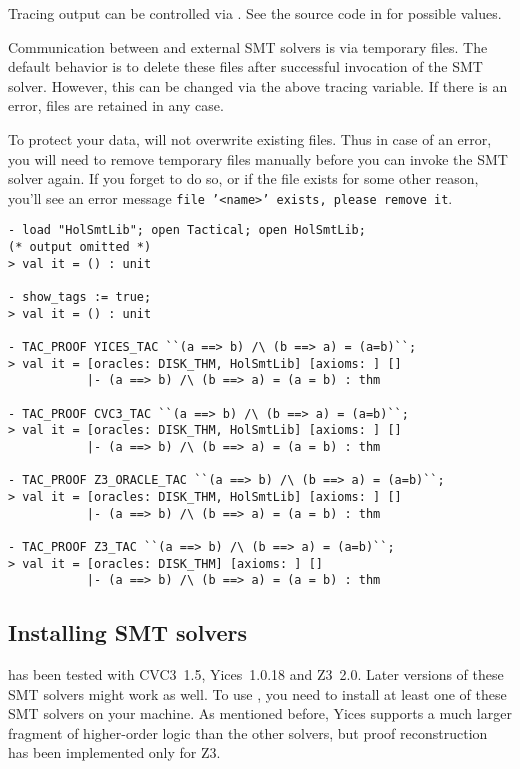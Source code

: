 Tracing output can be controlled via .  See the source code in  for
possible values.

Communication between \HOL{} and external SMT solvers is via temporary
files.  The default behavior is to delete these files after successful
invocation of the SMT solver.  However, this can be changed via the
above tracing variable.  If there is an error, files are retained in
any case.

To protect your data,  will not overwrite existing
files.  Thus in case of an error, you will need to remove temporary
files manually before you can invoke the SMT solver again.  If you
forget to do so, or if the file exists for some other reason, you'll
see an error message \texttt{file '<name>' exists, please remove it}.

\begin{session}
\begin{verbatim}
- load "HolSmtLib"; open Tactical; open HolSmtLib;
(* output omitted *)
> val it = () : unit

- show_tags := true;
> val it = () : unit

- TAC_PROOF YICES_TAC ``(a ==> b) /\ (b ==> a) = (a=b)``;
> val it = [oracles: DISK_THM, HolSmtLib] [axioms: ] []
           |- (a ==> b) /\ (b ==> a) = (a = b) : thm

- TAC_PROOF CVC3_TAC ``(a ==> b) /\ (b ==> a) = (a=b)``;
> val it = [oracles: DISK_THM, HolSmtLib] [axioms: ] []
           |- (a ==> b) /\ (b ==> a) = (a = b) : thm

- TAC_PROOF Z3_ORACLE_TAC ``(a ==> b) /\ (b ==> a) = (a=b)``;
> val it = [oracles: DISK_THM, HolSmtLib] [axioms: ] []
           |- (a ==> b) /\ (b ==> a) = (a = b) : thm

- TAC_PROOF Z3_TAC ``(a ==> b) /\ (b ==> a) = (a=b)``;
> val it = [oracles: DISK_THM] [axioms: ] []
           |- (a ==> b) /\ (b ==> a) = (a = b) : thm
\end{verbatim}
\end{session}

\subsection{Installing SMT solvers}

 has been tested with CVC3~1.5, Yices~1.0.18 and Z3~2.0.
Later versions of these SMT solvers might work as well.  To use
, you need to install at least one of these SMT solvers
on your machine.  As mentioned before, Yices supports a much larger
fragment of higher-order logic than the other solvers, but proof
reconstruction has been implemented only for Z3.

